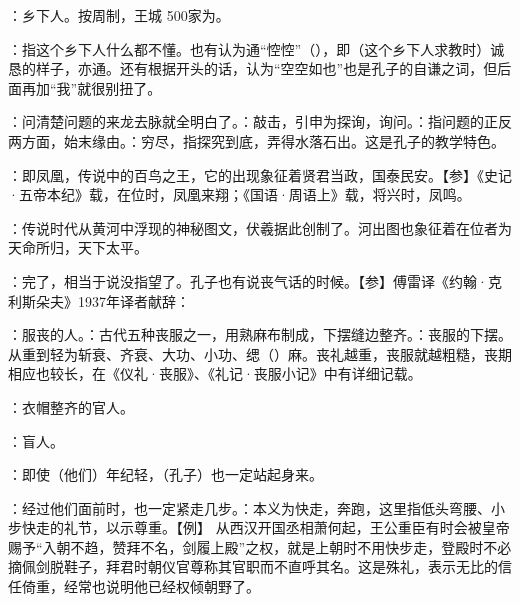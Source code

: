 {
\item {}：乡下人。按周制，王城 500家为。
\item {}：指这个乡下人什么都不懂。也有认为通“悾悾”（），即（这个乡下人求教时）诚恳的样子，亦通。还有根据开头的话，认为“空空如也”也是孔子的自谦之词，但后面再加“我”就很别扭了。
\item {}：问清楚问题的来龙去脉就全明白了。：敲击，引申为探询，询问。：指问题的正反两方面，始末缘由。：穷尽，指探究到底，弄得水落石出。这是孔子的教学特色。
}
{}


{
\item {}：即凤凰，传说中的百鸟之王，它的出现象征着贤君当政，国泰民安。【参】《史记·五帝本纪》载，在位时，凤凰来翔；《国语·周语上》载，将兴时，凤鸣。
\item {}：传说时代从黄河中浮现的神秘图文，伏羲据此创制了。河出图也象征着在位者为天命所归，天下太平。
\item {}：完了，相当于说没指望了。孔子也有说丧气话的时候。【参】傅雷译《约翰·克利斯朵夫》1937年译者献辞： %
}
{}


{
\item {}：服丧的人。：古代五种丧服之一，用熟麻布制成，下摆缝边整齐。：丧服的下摆。从重到轻为斩衰、齐衰、大功、小功、缌（）麻。丧礼越重，丧服就越粗糙，丧期相应也较长，在《仪礼·丧服》、《礼记·丧服小记》中有详细记载。
\item {}：衣帽整齐的官人。
\item {}：盲人。
\item {}：即使（他们）年纪轻，（孔子）也一定站起身来。
\item {}：经过他们面前时，也一定紧走几步。：本义为快走，奔跑，这里指低头弯腰、小步快走的礼节，以示尊重。【例】 从西汉开国丞相萧何起，王公重臣有时会被皇帝赐予“入朝不趋，赞拜不名，剑履上殿”之权，就是上朝时不用快步走，登殿时不必摘佩剑脱鞋子，拜君时朝仪官尊称其官职而不直呼其名。这是殊礼，表示无比的信任倚重，经常也说明他已经权倾朝野了。
}
{}


